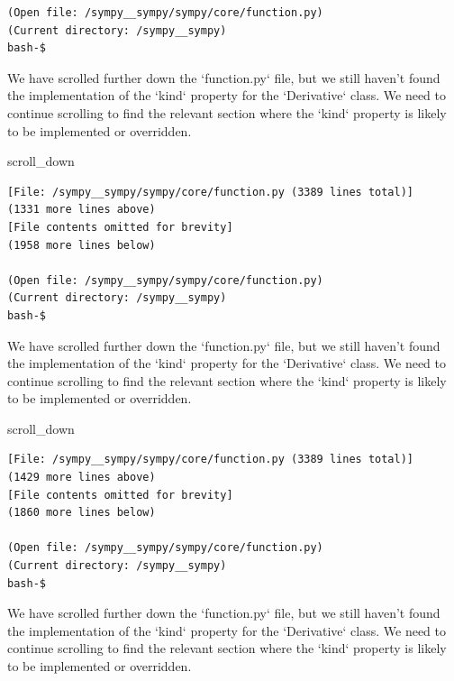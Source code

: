 {\begin{observationbox}
\begin{Verbatim}[breaklines=true, breakanywhere=true]
(Open file: /sympy__sympy/sympy/core/function.py)
(Current directory: /sympy__sympy)
bash-$
\end{Verbatim}
\end{observationbox}
\begin{agentbox}
We have scrolled further down the `function.py` file, but we still haven't found the implementation of the `kind` property for the `Derivative` class. We need to continue scrolling to find the relevant section where the `kind` property is likely to be implemented or overridden.



\hrulefill
\begin{CodeVerbatim}[breaklines=true, breakanywhere=true]
scroll_down
\end{CodeVerbatim}
\end{agentbox}
\begin{observationbox}\begin{Verbatim}[breaklines=true, breakanywhere=true]
[File: /sympy__sympy/sympy/core/function.py (3389 lines total)]
(1331 more lines above)
[File contents omitted for brevity]
(1958 more lines below)

(Open file: /sympy__sympy/sympy/core/function.py)
(Current directory: /sympy__sympy)
bash-$
\end{Verbatim}
\end{observationbox}
\begin{agentbox}
We have scrolled further down the `function.py` file, but we still haven't found the implementation of the `kind` property for the `Derivative` class. We need to continue scrolling to find the relevant section where the `kind` property is likely to be implemented or overridden.



\hrulefill
\begin{CodeVerbatim}[breaklines=true, breakanywhere=true]
scroll_down
\end{CodeVerbatim}
\end{agentbox}
\begin{observationbox}\begin{Verbatim}[breaklines=true, breakanywhere=true]
[File: /sympy__sympy/sympy/core/function.py (3389 lines total)]
(1429 more lines above)
[File contents omitted for brevity]
(1860 more lines below)

(Open file: /sympy__sympy/sympy/core/function.py)
(Current directory: /sympy__sympy)
bash-$
\end{Verbatim}
\end{observationbox}
\begin{agentbox}
We have scrolled further down the `function.py` file, but we still haven't found the implementation of the `kind` property for the `Derivative` class. We need to continue scrolling to find the relevant section where the `kind` property is likely to be implemented or overridden.




\end{agentbox}}
